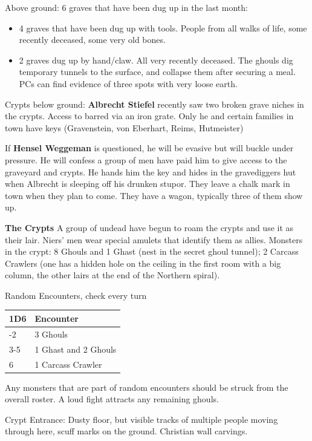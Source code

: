 \documentclass[
]{book}
\providecommand{\tightlist}{%
  \setlength{\itemsep}{0pt}\setlength{\parskip}{0pt}}
\begin{document}
Above ground: 6 graves that have been dug up in the last month:

\begin{itemize}
\tightlist
\item
  4 graves that have been dug up with tools. People from all walks of life, some recently deceased, some very old bones.
\item
  2 graves dug up by hand/claw. All very recently deceased. The ghouls dig temporary tunnels to the surface, and collapse them after securing a meal. PCs can find evidence of three spots with very loose earth.
\end{itemize}

Crypts below ground: \textbf{Albrecht Stiefel} recently saw two broken grave niches in the crypts. Access to barred via an iron grate. Only he and certain families in town have keys (Gravenstein, von Eberhart, Reims, Hutmeister)

If \textbf{Hensel Weggeman} is questioned, he will be evasive but will buckle under pressure. He will confess a group of men have paid him to give access to the graveyard and crypts. He hands him the key and hides in the gravediggers hut when Albrecht is sleeping off his drunken stupor. They leave a chalk mark in town when they plan to come. They have a wagon, typically three of them show up.

\textbf{The Crypts}
A group of undead have begun to roam the crypts and use it as their lair. Niers' men wear special amulets that identify them as allies. Monsters in the crypt: 8 Ghouls and 1 Ghast (nest in the secret ghoul tunnel); 2 Carcass Crawlers (one has a hidden hole on the ceiling in the first room with a big column, the other lairs at the end of the Northern spiral).

Random Encounters, check every turn

\begin{longtable}[]{@{}ll@{}}
\toprule\noalign{}
1D6 & Encounter \\
\midrule\noalign{}
\endhead
\bottomrule\noalign{}
\endlastfoot
1-2 & 3 Ghouls \\
3-5 & 1 Ghast and 2 Ghouls \\
6 & 1 Carcass Crawler \\
\end{longtable}

Any monsters that are part of random encounters should be struck from the overall roster. A loud fight attracts any remaining ghouls.

Crypt Entrance: Dusty floor, but visible tracks of multiple people moving through here, scuff marks on the ground. Christian wall carvings.
\end{document}
